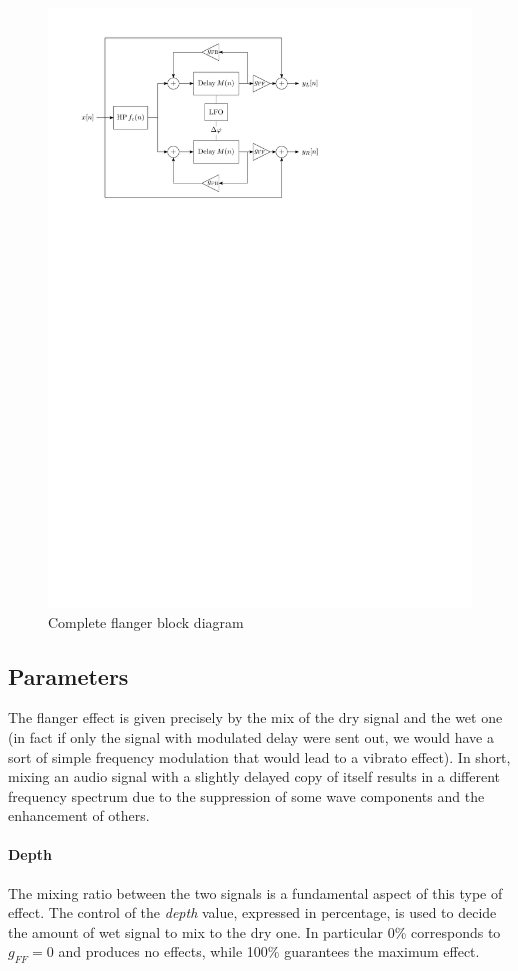 \begin{figure}
	\centering
	\includegraphics[width=0.7\linewidth]{assets/diagram-full.pdf}
	\caption{Complete flanger block diagram}
	\label{fig:diag}
\end{figure}

\subsection{Parameters}\label{sec:parameters}

The flanger effect is given precisely by the mix of the dry signal and the wet one (in fact if only the signal with modulated delay were sent out, we would have a sort of simple frequency modulation that would lead to a vibrato effect). In short, mixing an audio signal with a slightly delayed copy of itself results in a different frequency spectrum due to the suppression of some wave components and the enhancement of others.

\paragraph{Depth}
The mixing ratio between the two signals is a fundamental aspect of this type of effect. The control of the \emph{depth} value, expressed in percentage, is used to decide the amount of wet signal to mix to the dry one. In particular 0\% corresponds to $g_{FF} = 0$ and produces no effects, while 100\% guarantees the maximum effect.

